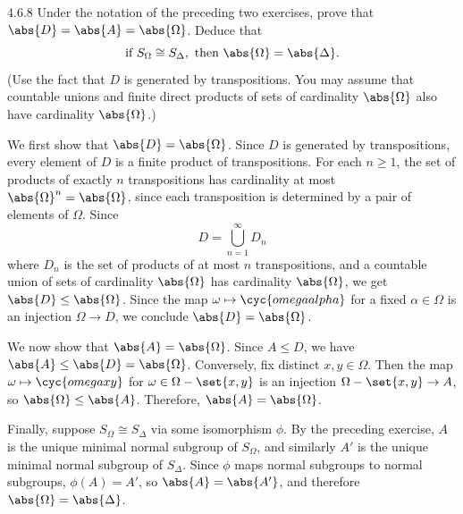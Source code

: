 \begin{exercise}{4.6.8}
	Under the notation of the preceding two exercises, prove that $\abs{D} = \abs{A} = \abs{\Omega}$.
	Deduce that
	\[
		\text{if }S_\Omega \cong S_\Delta, \text{ then } \abs{\Omega} = \abs{\Delta}.
	\]
	(Use the fact that $D$ is generated by transpositions.
	You may assume that countable unions and finite direct products of sets of cardinality $\abs{\Omega}$ also have cardinality $\abs{\Omega}$.)
\end{exercise}

\begin{sol}
	We first show that $\abs{D} = \abs{\Omega}$.
	Since $D$ is generated by transpositions, every element of $D$ is a finite product of transpositions.
	For each $n \geq 1$, the set of products of exactly $n$ transpositions has cardinality at most $\abs{\Omega}^n = \abs{\Omega}$, since each transposition is determined by a pair of elements of $\Omega$.
	Since
	\[
		D = \bigcup_{n=1}^\infty D_n
	\]
	where $D_n$ is the set of products of at most $n$ transpositions, and a countable union of sets of cardinality $\abs{\Omega}$ has cardinality $\abs{\Omega}$, we get $\abs{D} \leq \abs{\Omega}$.
	Since the map $\omega \mapsto \cyc{omega alpha}$ for a fixed $\alpha \in \Omega$ is an injection $\Omega \to D$, we conclude $\abs{D} = \abs{\Omega}$.

    We now show that $\abs{A} = \abs{\Omega}$.
	Since $A \leq D$, we have $\abs{A} \leq \abs{D} = \abs{\Omega}$.
	Conversely, fix distinct $x, y \in \Omega$.
	Then the map $\omega \mapsto \cyc{omega x y}$ for $\omega \in \Omega - \set{x, y}$ is an injection $\Omega - \set{x, y} \to A$, so $\abs{\Omega} \leq \abs{A}$.
	Therefore, $\abs{A} = \abs{\Omega}$.

    Finally, suppose $S_\Omega \cong S_\Delta$ via some isomorphism $\phi$.
	By the preceding exercise, $A$ is the unique minimal normal subgroup of $S_\Omega$, and similarly $A'$ is the unique minimal normal subgroup of $S_\Delta$.
	Since $\phi$ maps normal subgroups to normal subgroups, $\phi(A) = A'$, so $\abs{A} = \abs{A'}$, and therefore $\abs{\Omega} = \abs{\Delta}$.
\end{sol}